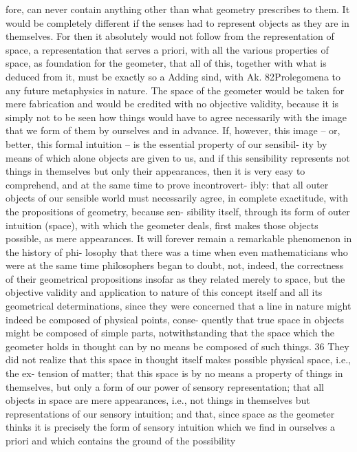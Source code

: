fore, can never contain anything other than what geometry prescribes
to them. It would be completely different if the senses had to represent
objects as they are in themselves. For then it absolutely would not follow
from the representation of space, a representation that serves a priori,
with all the various properties of space, as foundation for the geometer,
that all of this, together with what is deduced from it, must be exactly so
a
Adding sind, with Ak.
82Prolegomena to any future metaphysics
in nature. The space of the geometer would be taken for mere fabrication
and would be credited with no objective validity, because it is simply not
to be seen how things would have to agree necessarily with the image that
we form of them by ourselves and in advance. If, however, this image –
or, better, this formal intuition – is the essential property of our sensibil-
ity by means of which alone objects are given to us, and if this sensibility
represents not things in themselves but only their appearances, then it
is very easy to comprehend, and at the same time to prove incontrovert-
ibly: that all outer objects of our sensible world must necessarily agree,
in complete exactitude, with the propositions of geometry, because sen-
sibility itself, through its form of outer intuition (space), with which the
geometer deals, ﬁrst makes those objects possible, as mere appearances.
It will forever remain a remarkable phenomenon in the history of phi-
losophy that there was a time when even mathematicians who were at
the same time philosophers began to doubt, not, indeed, the correctness
of their geometrical propositions insofar as they related merely to space,
but the objective validity and application to nature of this concept itself
and all its geometrical determinations, since they were concerned that
a line in nature might indeed be composed of physical points, conse-
quently that true space in objects might be composed of simple parts,
notwithstanding that the space which the geometer holds in thought can
by no means be composed of such things. 36 They did not realize that
this space in thought itself makes possible physical space, i.e., the ex-
tension of matter; that this space is by no means a property of things in
themselves, but only a form of our power of sensory representation; that
all objects in space are mere appearances, i.e., not things in themselves
but representations of our sensory intuition; and that, since space as the
geometer thinks it is precisely the form of sensory intuition which we
ﬁnd in ourselves a priori and which contains the ground of the possibility
